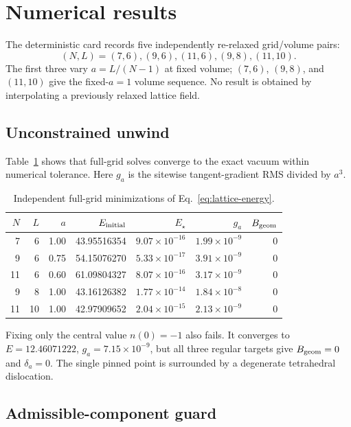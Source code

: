\documentclass[11pt]{article}
\theoremstyle{definition}
\theoremstyle{remark}
\begin{document}
\section{Numerical results}

The deterministic card records five independently re-relaxed grid/volume
pairs:
\begin{equation}
 (N,L)=(7,6),(9,6),(11,6),(9,8),(11,10).
 \label{eq:grid-sequence}
\end{equation}
The first three vary $a=L/(N-1)$ at fixed volume; $(7,6)$, $(9,8)$, and
$(11,10)$ give the fixed-$a=1$ volume sequence. No result is obtained by
interpolating a previously relaxed lattice field.

\subsection{Unconstrained unwind}

Table~\ref{tab:unwind} shows that full-grid solves converge to the exact
vacuum within numerical tolerance. Here $g_a$ is the sitewise tangent-gradient
RMS divided by $a^3$.

\begin{table}[htbp]
\centering
\small
\caption{Independent full-grid minimizations of Eq.~\eqref{eq:lattice-energy}.}
\label{tab:unwind}
\begin{tabular}{rrrrrrr}
\toprule
$N$&$L$&$a$&$E_{\rm initial}$&$E_\star$&$g_a$&$B_{\rm geom}$\\
\midrule
7&6&1.00&43.95516354&$9.07\times10^{-16}$&$1.99\times10^{-9}$&0\\
9&6&0.75&54.15076270&$5.33\times10^{-17}$&$3.91\times10^{-9}$&0\\
11&6&0.60&61.09804327&$8.07\times10^{-16}$&$3.17\times10^{-9}$&0\\
9&8&1.00&43.16126382&$1.77\times10^{-14}$&$1.84\times10^{-8}$&0\\
11&10&1.00&42.97909652&$2.04\times10^{-15}$&$2.13\times10^{-9}$&0\\
\bottomrule
\end{tabular}
\end{table}

Fixing only the central value $n(0)=-1$ also fails. It converges to
$E=12.46071222$, $g_a=7.15\times10^{-9}$, but all three regular targets give
$B_{\rm geom}=0$ and $\delta_a=0$. The single pinned point is surrounded by a
degenerate tetrahedral dislocation.

\subsection{Admissible-component guard}
\end{document}
